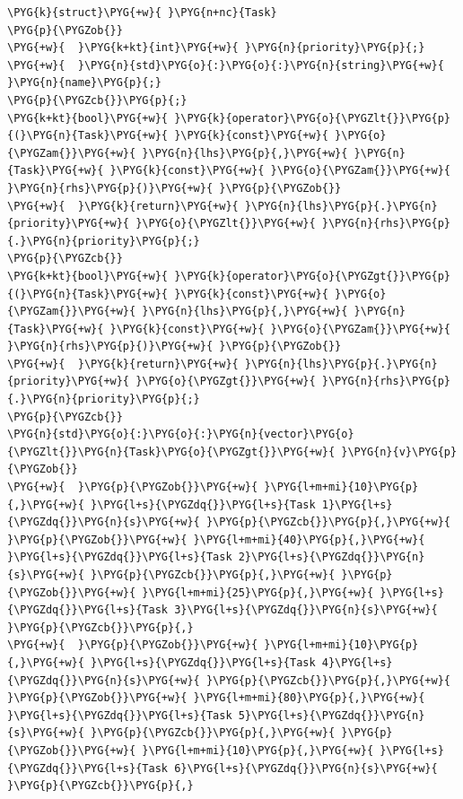 \begin{itemize}
\begin{codeblockbg}
\begin{Verbatim}[commandchars=\\\{\},breaklines=true,breakanywhere=true,fontsize=\codefont,xleftmargin=17bp]
\PYG{k}{struct}\PYG{+w}{ }\PYG{n+nc}{Task}
\PYG{p}{\PYGZob{}}
\PYG{+w}{  }\PYG{k+kt}{int}\PYG{+w}{ }\PYG{n}{priority}\PYG{p}{;}
\PYG{+w}{  }\PYG{n}{std}\PYG{o}{:}\PYG{o}{:}\PYG{n}{string}\PYG{+w}{ }\PYG{n}{name}\PYG{p}{;}
\PYG{p}{\PYGZcb{}}\PYG{p}{;}
\PYG{k+kt}{bool}\PYG{+w}{ }\PYG{k}{operator}\PYG{o}{\PYGZlt{}}\PYG{p}{(}\PYG{n}{Task}\PYG{+w}{ }\PYG{k}{const}\PYG{+w}{ }\PYG{o}{\PYGZam{}}\PYG{+w}{ }\PYG{n}{lhs}\PYG{p}{,}\PYG{+w}{ }\PYG{n}{Task}\PYG{+w}{ }\PYG{k}{const}\PYG{+w}{ }\PYG{o}{\PYGZam{}}\PYG{+w}{ }\PYG{n}{rhs}\PYG{p}{)}\PYG{+w}{ }\PYG{p}{\PYGZob{}}
\PYG{+w}{  }\PYG{k}{return}\PYG{+w}{ }\PYG{n}{lhs}\PYG{p}{.}\PYG{n}{priority}\PYG{+w}{ }\PYG{o}{\PYGZlt{}}\PYG{+w}{ }\PYG{n}{rhs}\PYG{p}{.}\PYG{n}{priority}\PYG{p}{;}
\PYG{p}{\PYGZcb{}}
\PYG{k+kt}{bool}\PYG{+w}{ }\PYG{k}{operator}\PYG{o}{\PYGZgt{}}\PYG{p}{(}\PYG{n}{Task}\PYG{+w}{ }\PYG{k}{const}\PYG{+w}{ }\PYG{o}{\PYGZam{}}\PYG{+w}{ }\PYG{n}{lhs}\PYG{p}{,}\PYG{+w}{ }\PYG{n}{Task}\PYG{+w}{ }\PYG{k}{const}\PYG{+w}{ }\PYG{o}{\PYGZam{}}\PYG{+w}{ }\PYG{n}{rhs}\PYG{p}{)}\PYG{+w}{ }\PYG{p}{\PYGZob{}}
\PYG{+w}{  }\PYG{k}{return}\PYG{+w}{ }\PYG{n}{lhs}\PYG{p}{.}\PYG{n}{priority}\PYG{+w}{ }\PYG{o}{\PYGZgt{}}\PYG{+w}{ }\PYG{n}{rhs}\PYG{p}{.}\PYG{n}{priority}\PYG{p}{;}
\PYG{p}{\PYGZcb{}}
\PYG{n}{std}\PYG{o}{:}\PYG{o}{:}\PYG{n}{vector}\PYG{o}{\PYGZlt{}}\PYG{n}{Task}\PYG{o}{\PYGZgt{}}\PYG{+w}{ }\PYG{n}{v}\PYG{p}{\PYGZob{}}
\PYG{+w}{  }\PYG{p}{\PYGZob{}}\PYG{+w}{ }\PYG{l+m+mi}{10}\PYG{p}{,}\PYG{+w}{ }\PYG{l+s}{\PYGZdq{}}\PYG{l+s}{Task 1}\PYG{l+s}{\PYGZdq{}}\PYG{n}{s}\PYG{+w}{ }\PYG{p}{\PYGZcb{}}\PYG{p}{,}\PYG{+w}{ }\PYG{p}{\PYGZob{}}\PYG{+w}{ }\PYG{l+m+mi}{40}\PYG{p}{,}\PYG{+w}{ }\PYG{l+s}{\PYGZdq{}}\PYG{l+s}{Task 2}\PYG{l+s}{\PYGZdq{}}\PYG{n}{s}\PYG{+w}{ }\PYG{p}{\PYGZcb{}}\PYG{p}{,}\PYG{+w}{ }\PYG{p}{\PYGZob{}}\PYG{+w}{ }\PYG{l+m+mi}{25}\PYG{p}{,}\PYG{+w}{ }\PYG{l+s}{\PYGZdq{}}\PYG{l+s}{Task 3}\PYG{l+s}{\PYGZdq{}}\PYG{n}{s}\PYG{+w}{ }\PYG{p}{\PYGZcb{}}\PYG{p}{,}
\PYG{+w}{  }\PYG{p}{\PYGZob{}}\PYG{+w}{ }\PYG{l+m+mi}{10}\PYG{p}{,}\PYG{+w}{ }\PYG{l+s}{\PYGZdq{}}\PYG{l+s}{Task 4}\PYG{l+s}{\PYGZdq{}}\PYG{n}{s}\PYG{+w}{ }\PYG{p}{\PYGZcb{}}\PYG{p}{,}\PYG{+w}{ }\PYG{p}{\PYGZob{}}\PYG{+w}{ }\PYG{l+m+mi}{80}\PYG{p}{,}\PYG{+w}{ }\PYG{l+s}{\PYGZdq{}}\PYG{l+s}{Task 5}\PYG{l+s}{\PYGZdq{}}\PYG{n}{s}\PYG{+w}{ }\PYG{p}{\PYGZcb{}}\PYG{p}{,}\PYG{+w}{ }\PYG{p}{\PYGZob{}}\PYG{+w}{ }\PYG{l+m+mi}{10}\PYG{p}{,}\PYG{+w}{ }\PYG{l+s}{\PYGZdq{}}\PYG{l+s}{Task 6}\PYG{l+s}{\PYGZdq{}}\PYG{n}{s}\PYG{+w}{ }\PYG{p}{\PYGZcb{}}\PYG{p}{,}

\end{Verbatim}
\end{codeblockbg}
\end{itemize}
